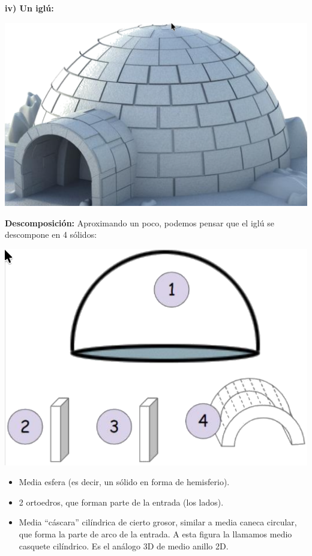\documentclass[12pt,a4paper]{article}
\begin{document}
\begin{multicols}{2}
\vspace{4mm}


\textbf{iv) Un iglú:}

\begin{center}
\includegraphics[width=0.7\columnwidth]{Figuras/fig25.png}
\end{center}

\textbf{Descomposición:} Aproximando un poco, podemos pensar que el iglú se descompone en 4 sólidos:

\begin{center}
\includegraphics[width=0.75\columnwidth]{Figuras/fig26.png}
\end{center}

\begin{itemize}[nosep]
    \item Media esfera (es decir, un sólido en forma de hemisferio).
    \item 2 ortoedros, que forman parte de la entrada (los lados).
    \item Media ``cáscara'' cilíndrica de cierto grosor, similar a media caneca circular, que forma la parte de arco de la entrada. A esta figura la llamamos medio casquete cilíndrico. Es el análogo 3D de medio anillo 2D.
\end{itemize}


\end{multicols}
\end{document}
